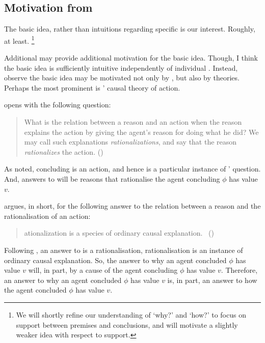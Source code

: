 \subsection{Motivation from \citeauthor{Davidson:1963aa}}

\begin{note}
  The basic idea, rather than intuitions regarding specific  is our interest.
  Roughly, at least.%
  \footnote{
    We will shortly refine our understanding of `why?' and `how?' to focus on support between premises and conclusions, and will motivate a slightly weaker idea with respect to support.
  }

  Additional  may provide additional motivation for the basic idea.
  Though, I think the basic idea is sufficiently intuitive independently of individual .
  Instead, observe the basic idea may be motivated not only by , but also by theories.
  Perhaps the most prominent is \citeauthor{Davidson:1963aa}' causal theory of action.

  \citeauthor{Davidson:1963aa} opens \textcite{Davidson:1963aa} with the following question:

  \begin{quote}
    What is the relation between a reason and an action when the reason explains the action by giving the agent's reason for doing what he did?
    We may call such explanations \emph{rationalizations}, and say that the reason \emph{rationalizes} the action.%
    \mbox{}\hfill\mbox{(\citeyear[685]{Davidson:1963aa})}
  \end{quote}

  As noted, concluding is an action, and hence \qWhy{} is a particular instance of \citeauthor{Davidson:1963aa}' question.
  And, answers to \qWhy{} will be reasons that rationalise the agent concluding \(\phi\) has value \(v\).

  \citeauthor{Davidson:1963aa} argues, in short, for the following answer to the relation between a reason and the rationalisation of an action:

  \begin{quote}
    \begin{enumerate}[label=\arabic*]
      [R]ationalization is a species of ordinary causal explanation.\newline
      \mbox{ }\hfill\mbox{(\citeyear[685]{Davidson:1963aa})}
    \end{enumerate}
  \end{quote}

  Following \citeauthor{Davidson:1963aa}, an answer to \qWhy{} is a rationalisation, rationalisation is an instance of ordinary causal explanation.
  So, the answer to why an agent concluded \(\phi\) has value \(v\) will, in part, by a cause of the agent concluding \(\phi\) has value \(v\).
  Therefore, an answer to why an agent concluded \(\phi\) has value \(v\) is, in part, an answer to how the agent concluded \(\phi\) has value \(v\).


\end{note}
